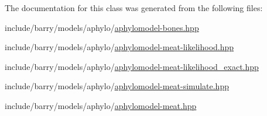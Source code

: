 The documentation for this class was generated from the following files\+:\begin{DoxyCompactItemize}
\item 
include/barry/models/aphylo/\hyperlink{aphylomodel-bones_8hpp}{aphylomodel-\/bones.\+hpp}\item 
include/barry/models/aphylo/\hyperlink{aphylomodel-meat-likelihood_8hpp}{aphylomodel-\/meat-\/likelihood.\+hpp}\item 
include/barry/models/aphylo/\hyperlink{aphylomodel-meat-likelihood__exact_8hpp}{aphylomodel-\/meat-\/likelihood\+\_\+exact.\+hpp}\item 
include/barry/models/aphylo/\hyperlink{aphylomodel-meat-simulate_8hpp}{aphylomodel-\/meat-\/simulate.\+hpp}\item 
include/barry/models/aphylo/\hyperlink{aphylomodel-meat_8hpp}{aphylomodel-\/meat.\+hpp}\end{DoxyCompactItemize}
